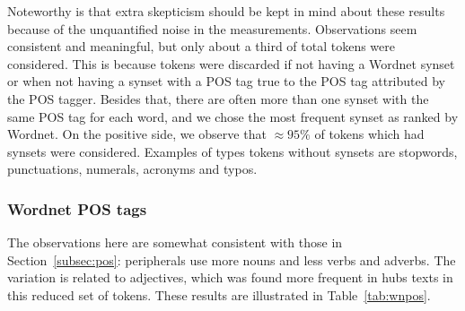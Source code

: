 Noteworthy is that extra skepticism should be kept in mind about these results
because of the unquantified noise in the measurements.
Observations seem consistent and meaningful, but only about a third of total tokens
were considered.
This is because tokens were discarded if not having a Wordnet synset
or when not having a synset with a POS tag true to the POS tag attributed by the POS tagger.
Besides that, there are often more than one synset with the same POS tag for each word,
and we chose the most frequent synset as ranked by Wordnet.
On the positive side, we observe that $\approx 95\%$ of tokens which had synsets
were considered.
Examples of types tokens without synsets are stopwords, punctuations, numerals, acronyms and typos.

\subsubsection{Wordnet POS tags}\label{subsec:wnpos}
The observations here are somewhat consistent with those in Section~\ref{subsec:pos}:
peripherals use more nouns and less verbs and adverbs.
The variation is related to adjectives, which was found more frequent in hubs texts
in this reduced set of tokens.
These results are illustrated in Table~\ref{tab:wnpos}.

\FloatBarrier


